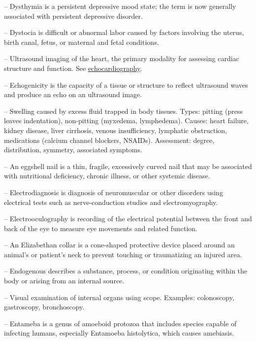 -- Dysthymia is a persistent depressive mood state; the term is now generally associated with persistent depressive disorder.

-- Dystocia is difficult or abnormal labor caused by factors involving the uterus, birth canal, fetus, or maternal and fetal conditions.

-- Ultrasound imaging of the heart, the primary modality for assessing cardiac structure and function. See \hyperlink{Echocardiography}{echocardiography}.

-- Echogenicity is the capacity of a tissue or structure to reflect ultrasound waves and produce an echo on an ultrasound image.

-- Swelling caused by excess fluid trapped in body tissues. Types: pitting (press leaves indentation), non-pitting (myxedema, lymphedema). Causes: heart failure, kidney disease, liver cirrhosis, venous insufficiency, lymphatic obstruction, medications (calcium channel blockers, NSAIDs). Assessment: degree, distribution, symmetry, associated symptoms.

-- An eggshell nail is a thin, fragile, excessively curved nail that may be associated with nutritional deficiency, chronic illness, or other systemic disease.

-- Electrodiagnosis is diagnosis of neuromuscular or other disorders using electrical tests such as nerve-conduction studies and electromyography.

-- Electrooculography is recording of the electrical potential between the front and back of the eye to measure eye movements and related function.

-- An Elizabethan collar is a cone-shaped protective device placed around an animal's or patient's neck to prevent touching or traumatizing an injured area.

-- Endogenous describes a substance, process, or condition originating within the body or arising from an internal source.

-- Visual examination of internal organs using scope. Examples: colonoscopy, gastroscopy, bronchoscopy.

-- Entameba is a genus of amoeboid protozoa that includes species capable of infecting humans, especially Entamoeba histolytica, which causes amebiasis.

